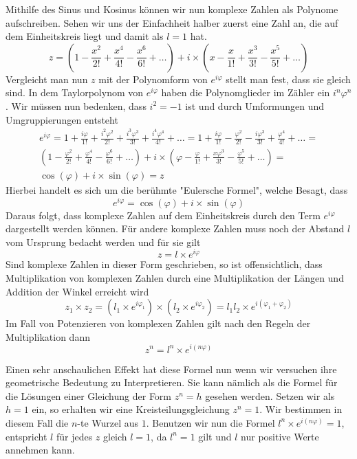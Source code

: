 \documentclass[a4paper,12pt]{article} %
\begin{document}
Mithilfe des Sinus und Kosinus können wir nun komplexe Zahlen als Polynome aufschreiben. Sehen wir uns der Einfachheit halber zuerst eine Zahl an, die auf dem Einheitskreis liegt und damit als $l=1$ hat.
\begin{equation}
	z=%
	\left(1-\frac{x^2}{2!}+\frac{x^4}{4!}-\frac{x^6}{6!}+\dots\right)+i\times\left(x-\frac{x}{1!}+\frac{x^3}{3!}-\frac{x^5}{5!}+\dots\right)
\end{equation}
Vergleicht man nun $z$ mit der Polynomform von $e^{i\varphi}$ stellt man fest, dass sie gleich sind. 
In dem Taylorpolynom von $e^{i\varphi}$ haben die Polynomglieder im Zähler ein $i^n\varphi^n$. Wir müssen nun bedenken, dass $i^2=-1$ ist und durch Umformungen und Umgruppierungen entsteht
\begin{multline}
	e^{i\varphi}=1+\frac{i\varphi}{1!}+\frac{i^2\varphi^2}{2!}+\frac{i^3\varphi^3}{3!}+\frac{i^4\varphi^4}{4!}+\dots=
	1+\frac{i\varphi}{1!}-\frac{\varphi^2}{2!}-\frac{i\varphi^3}{3!}+\frac{\varphi^4}{4!}+\dots=\\
	\left(1-\frac{\varphi^2}{2!}+\frac{\varphi^4}{4!}-\frac{\varphi^6}{6!}+\dots\right)+i\times\left(\varphi-\frac{\varphi}{1!}+\frac{x\varphi^3}{3!}-\frac{\varphi^5}{5!}+\dots\right) =\\
	\cos(\varphi) + i\times\sin(\varphi)=z
\end{multline}
Hierbei handelt es sich um die berühmte "{Eulersche Formel}", welche Besagt, dass
\[e^{i\varphi}=\cos(\varphi)+i\times\sin(\varphi)\]
Daraus folgt, dass komplexe Zahlen auf dem Einheitskreis durch den Term $e^{i\varphi}$ dargestellt werden können. Für andere komplexe Zahlen muss noch der Abstand $l$ vom Ursprung bedacht werden und für sie gilt
\[z=l\times e^{i\varphi}\]
Sind komplexe Zahlen in dieser Form geschrieben, so ist offensichtlich, dass Multiplikation von komplexen Zahlen durch eine Multiplikation der Längen und Addition der Winkel erreicht wird
\[z_1\times z_2=(l_1 \times e^{i\varphi_1}) \times (l_2 \times e^{i\varphi_2})=l_1 l_2 \times e^{i(\varphi_1+\varphi_2)}\]
Im Fall von Potenzieren von komplexen Zahlen gilt nach den Regeln der Multiplikation dann
\[z^n=l^n \times e^{i(n\varphi)}\]

Einen sehr anschaulichen Effekt hat diese Formel nun wenn wir versuchen ihre geometrische Bedeutung zu Interpretieren.
Sie kann nämlich als die Formel für die Lösungen einer Gleichung der Form $z^n=h$ gesehen werden.
Setzen wir als $h=1$ ein, so erhalten wir eine Kreisteilungsgleichung $z^n=1$. Wir bestimmen in diesem Fall die $n$-te Wurzel aus $1$.
Benutzen wir nun die Formel $l^n \times e^{i(n\varphi)}=1$, entspricht $l$ für jedes $z$ gleich $l=1$, da $l^n=1$ gilt und $l$ nur positive Werte annehmen kann.
\end{document}

